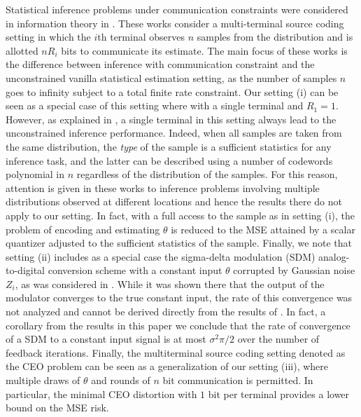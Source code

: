 \documentclass[letterpaper, conference]{IEEEtran}      %
\begin{document}
Statistical inference problems under communication constraints were considered in information theory in 
\cite{han1987hypothesis, zhang1988estimation, 720540}. These works consider a multi-terminal source coding setting in which the $i$th terminal observes $n$ samples from the distribution and is allotted $nR_i$ bits to communicate its estimate. The main focus of these works is the difference between inference with communication constraint and the unconstrained vanilla statistical estimation setting, as the number of samples $n$ goes to infinity subject to a total finite rate constraint. Our setting (i) can be seen as a special case of this setting where with a single terminal and $R_1 = 1$.%
However, as explained in \cite[Sec. III]{720540}, a single terminal in this setting always lead to the unconstrained inference performance. Indeed, when all samples are taken from the same distribution, the \emph{type} of the sample \cite{csiszar1998method} is a sufficient statistics for any inference task, and the latter can be described using a number of codewords polynomial in $n$ regardless of the distribution of the samples. For this reason, attention is given in these works to inference problems involving multiple distributions observed at different locations and hence the results there do not apply to our setting. In fact, with a full access to the sample as in setting (i), the problem of encoding and estimating $\theta$ is reduced to the MSE attained by a scalar quantizer adjusted to the sufficient statistics of the sample. Finally, we note that setting (ii) includes as a special case the sigma-delta modulation (SDM) analog-to-digital conversion scheme with a constant input $\theta$ corrupted by Gaussian noise $Z_i$, as was considered in \cite{53738}. While it was shown there that the output of the modulator converges to the true constant input, the rate of this convergence was not analyzed and cannot be derived directly from the results of \cite{53738}. In fact, a corollary from the results in this paper we conclude that the rate of convergence of a SDM to a constant input signal is at most $\sigma^2\pi/2$ over the number of feedback iterations. Finally, the multiterminal source coding setting denoted as the CEO problem \cite{berger1996ceo} can be seen as a generalization of our setting (iii), where multiple draws of $\theta$ and rounds of $n$ bit communication is permitted. In particular, the minimal CEO distortion with $1$ bit per terminal provides a lower bound on the MSE risk.  \par
\end{document}
